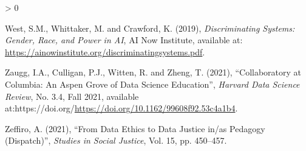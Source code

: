 \documentclass[
]{article}
\newlength{\cslhangindent}
\newenvironment{CSLReferences}[2] %
 {%
  \setlength{\parindent}{0pt}
  \ifodd #1 \everypar{\setlength{\hangindent}{\cslhangindent}}\ignorespaces\fi
  \ifnum #2 > 0
  \setlength{\parskip}{#2\baselineskip}
  \fi
 }%
 {}
\begin{document}
\begin{CSLReferences}{1}{0}
\leavevmode\hypertarget{ref-westDiscriminatingSystemsGender2019}{}%
West, S.M., Whittaker, M. and Crawford, K. (2019), \emph{Discriminating
{Systems}: {Gender}, {Race}, and {Power} in {AI}}, AI Now Institute,
available at:
\url{https://ainowinstitute.org/discriminatingsystems.pdf}.

\leavevmode\hypertarget{ref-zauggCollaboratoryColumbiaAspen2021}{}%
Zaugg, I.A., Culligan, P.J., Witten, R. and Zheng, T. (2021),
{``Collaboratory at {Columbia}: {An} {Aspen} {Grove} of {Data} {Science}
{Education}''}, \emph{Harvard Data Science Review}, No. 3.4, Fall 2021,
available
at:https://doi.org/\url{https://doi.org/10.1162/99608f92.53c4a1b4}.

\leavevmode\hypertarget{ref-zeffiroDataEthicsData2021}{}%
Zeffiro, A. (2021), {``From {Data} {Ethics} to {Data} {Justice} in/as
{Pedagogy} ({Dispatch})''}, \emph{Studies in Social Justice}, Vol. 15,
pp. 450--457.

\end{CSLReferences}
\end{document}
